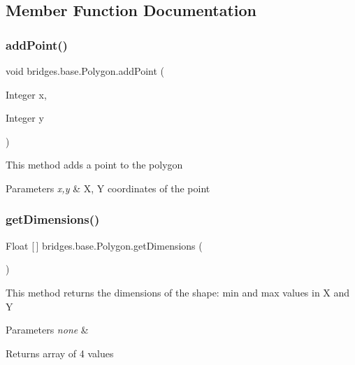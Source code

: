 \subsection{Member Function Documentation}
\mbox{\label{classbridges_1_1base_1_1_polygon_a23af8508f5ef7c2bbe0784264ee86e16}} 
\subsubsection{\texorpdfstring{addPoint()}{addPoint()}}
{\footnotesize\ttfamily void bridges.\+base.\+Polygon.\+add\+Point (\begin{DoxyParamCaption}\item[{Integer}]{x,  }\item[{Integer}]{y }\end{DoxyParamCaption})}

This method adds a point to the polygon


\begin{DoxyParams}{Parameters}
{\em x,y} & X, Y coordinates of the point \\
\hline
\end{DoxyParams}
\mbox{\label{classbridges_1_1base_1_1_polygon_ae6e7440de0d3de9084f924e08f515a67}} 
\subsubsection{\texorpdfstring{getDimensions()}{getDimensions()}}
{\footnotesize\ttfamily Float \mbox{[}$\,$\mbox{]} bridges.\+base.\+Polygon.\+get\+Dimensions (\begin{DoxyParamCaption}{ }\end{DoxyParamCaption})}

This method returns the dimensions of the shape\+: min and max values in X and Y


\begin{DoxyParams}{Parameters}
{\em none} & \\
\hline
\end{DoxyParams}
\begin{DoxyReturn}{Returns}
array of 4 values 
\end{DoxyReturn}
\mbox{\label{classbridges_1_1base_1_1_polygon_a12489d762f32ce5259ae6640ad95f188}} 
